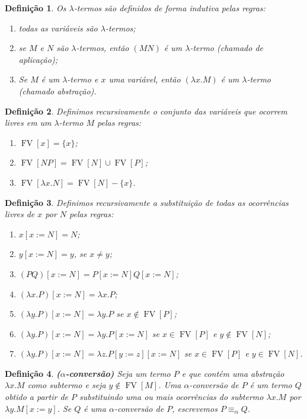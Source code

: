 \documentclass[12pt]{article}
\newtheorem{definition}{Definição}
\DeclareMathOperator{\FV}{\mathrm{FV}}
\begin{document}
\begin{definition}
  Os $\lambda$-termos são definidos de forma indutiva pelas regras:
  \begin{enumerate}
  \item todas as variáveis são $\lambda$-termos;
  \item se $M$ e $N$ são $\lambda$-termos, então $(MN)$ é um $\lambda$-termo (chamado de aplicação);
  \item Se $M$ é um $\lambda$-termo e $x$ uma variável, então $(\lambda x.M)$ é um $\lambda$-termo (chamado abstração). 
  \end{enumerate}
\end{definition}

\begin{definition}
  Definimos recursivamente o conjunto das variáveis que ocorrem livres em um $\lambda$-termo $M$ pelas regras:
  \begin{enumerate}
  \item $\FV[x] = \{x\}$;
  \item $\FV[NP] = \FV[N] \cup \FV[P]$;
  \item $\FV[\lambda x.N] = \FV[N] - \{x\}$.
  \end{enumerate}
\end{definition}

\begin{definition}
  Definimos recursivamente a substituição de todas as ocorrências livres de $x$ por $N$ pelas regras:
  \begin{enumerate}
  \item $x[x := N] = N$;
  \item $y[x := N] = y$, se $x \neq y$;
  \item $(PQ)[x := N] = P[x := N] Q[x := N]$;
  \item $(\lambda x.P)[x := N] = \lambda x.P$;
  \item $(\lambda y.P)[x := N] = \lambda y.P$ se $x \not\in \FV[P]$;
  \item $(\lambda y.P)[x := N] = \lambda y.P[x := N]$ se $x \in \FV[P]$ e $y \not\in \FV[N]$;
  \item $(\lambda y.P)[x := N] = \lambda z.P[y := z][x := N]$ se $x \in \FV[P]$ e $y \in \FV[N]$.  
  \end{enumerate}
\end{definition}

\begin{definition} \textbf{($\alpha$-conversão)}
  Seja um termo $P$ e que contém uma abstração $\lambda x.M$ como subtermo e seja $y \not\in \FV[M]$. Uma $\alpha$-conversão de $P$ é um termo $Q$ obtido a partir de $P$ substituindo uma ou mais ocorrências do subtermo $\lambda x.M$ por $\lambda y.M[x := y]$. Se $Q$ é uma $\alpha$-conversão de $P$, escrevemos $P \equiv_\alpha Q$. 
\end{definition}
\end{document}
